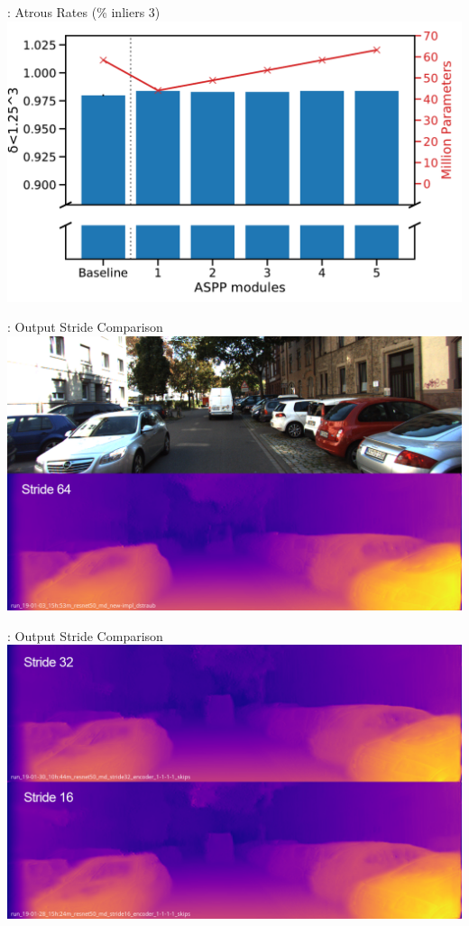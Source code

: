 \begin{frame}[c]{\subsecname: Atrous Rates (\% inliers 3)}
  \centering
  \includegraphics[width=1.0\textwidth]{figures/results/experiment2_d-125^3.pdf}
\end{frame}


\begin{frame}[c]{\subsecname: Output Stride Comparison}
  \centering
  \includegraphics[width=1.0\textwidth]{figures/images/stridecomparison_001.png}
\end{frame}

\begin{frame}[c]{\subsecname: Output Stride Comparison}
  \centering
  \includegraphics[width=1.0\textwidth]{figures/images/stridecomparison_002.png}
\end{frame}

